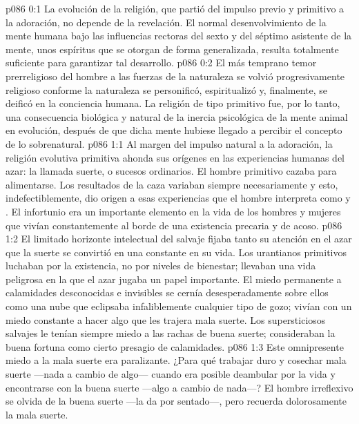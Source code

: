 \author{Brillante estrella vespertina}
\vs p086 0:1 La evolución de la religión, que partió del impulso previo y primitivo a la adoración, no depende de la revelación. El normal desenvolvimiento de la mente humana bajo las influencias rectoras del sexto y del séptimo asistente de la mente, unos espíritus que se otorgan de forma generalizada, resulta totalmente suficiente para garantizar tal desarrollo.
\vs p086 0:2 El más temprano temor prerreligioso del hombre a las fuerzas de la naturaleza se volvió progresivamente religioso conforme la naturaleza se personificó, espiritualizó y, finalmente, se deificó en la conciencia humana. La religión de tipo primitivo fue, por lo tanto, una consecuencia biológica y natural de la inercia psicológica de la mente animal en evolución, después de que dicha mente hubiese llegado a percibir el concepto de lo sobrenatural.
\vs p086 1:1 Al margen del impulso natural a la adoración, la religión evolutiva primitiva ahonda sus orígenes en las experiencias humanas del azar: la llamada suerte, o sucesos ordinarios. El hombre primitivo cazaba para alimentarse. Los resultados de la caza variaban siempre necesariamente y esto, indefectiblemente, dio origen a esas experiencias que el hombre interpreta como  y . El infortunio era un importante elemento en la vida de los hombres y mujeres que vivían constantemente al borde de una existencia precaria y de acoso.
\vs p086 1:2 El limitado horizonte intelectual del salvaje fijaba tanto su atención en el azar que la suerte se convirtió en una constante en su vida. Los urantianos primitivos luchaban por la existencia, no por niveles de bienestar; llevaban una vida peligrosa en la que el azar jugaba un papel importante. El miedo permanente a calamidades desconocidas e invisibles se cernía desesperadamente sobre ellos como una nube que eclipsaba infaliblemente cualquier tipo de gozo; vivían con un miedo constante a hacer algo que les trajera mala suerte. Los supersticiosos salvajes le tenían siempre miedo a las rachas de buena suerte; consideraban la buena fortuna como cierto presagio de calamidades.
\vs p086 1:3 Este omnipresente miedo a la mala suerte era paralizante. ¿Para qué trabajar duro y cosechar mala suerte ---nada a cambio de algo--- cuando era posible deambular por la vida y encontrarse con la buena suerte ---algo a cambio de nada---? El hombre irreflexivo se olvida de la buena suerte ---la da por sentado---, pero recuerda dolorosamente la mala suerte.
